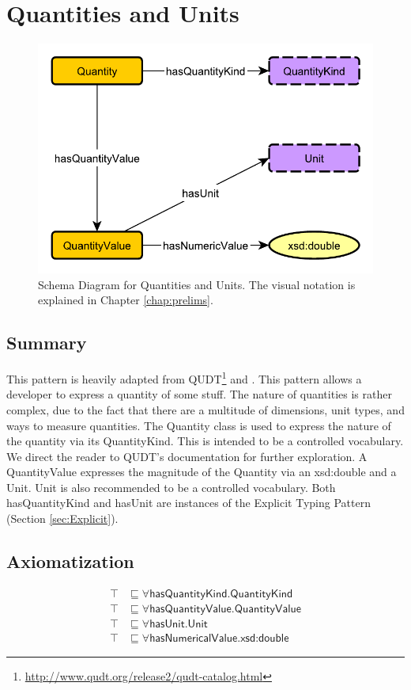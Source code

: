 \section{Quantities and Units}
\label{sec:Quantities}
\begin{figure}[h!]
\begin{center}
\includegraphics[width=.7\textwidth]{figures/quantities}
\end{center}
\caption{Schema Diagram for Quantities and Units. The visual notation is explained in Chapter \ref{chap:prelims}.}
\label{fig:Quantities}
\end{figure}
\subsection{Summary}
\label{sum:Quantities}
This pattern is heavily adapted from QUDT\footnote{\url{http://www.qudt.org/release2/qudt-catalog.html}} and \cite{momtut}. This pattern allows a developer to express a quantity of some stuff. The nature of quantities is rather complex, due to the fact that there are a multitude of dimensions, unit types, and ways to measure quantities. The \textsf{Quantity} class is used to express the nature of the quantity via its \textsf{QuantityKind}. This is intended to be a controlled vocabulary. We direct the reader to QUDT's documentation for further exploration. A \textsf{QuantityValue} expresses the magnitude of the \textsf{Quantity} via an \textsf{xsd:double} and a \textsf{Unit}. Unit is also recommended to be a controlled vocabulary. Both \textsf{hasQuantityKind} and \textsf{hasUnit} are instances of the Explicit Typing Pattern (Section \ref{sec:Explicit}).

\subsection{Axiomatization}
\label{axs:Quantities}
\begin{align}
\top &\sqsubseteq \forall \textsf{hasQuantityKind.QuantityKind} \\
\top &\sqsubseteq \forall \textsf{hasQuantityValue.QuantityValue} \\
\top &\sqsubseteq \forall \textsf{hasUnit.Unit} \\
\top &\sqsubseteq \forall \textsf{hasNumericalValue.xsd:double}
\end{align}

